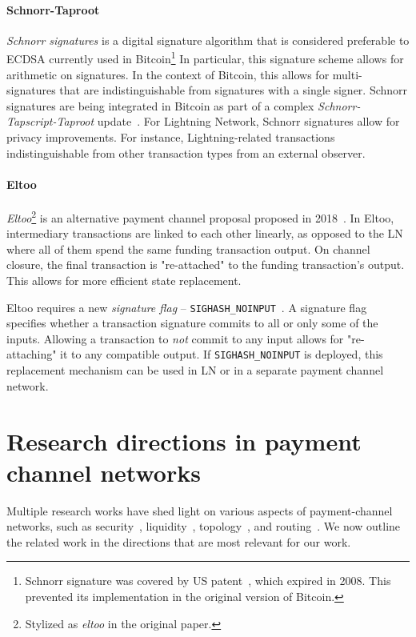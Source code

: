 \paragraph{Schnorr-Taproot}

\textit{Schnorr signatures} is a digital signature algorithm that is considered preferable to ECDSA currently used in Bitcoin\footnote{Schnorr signature was covered by US patent~\cite{Schnorr1989}, which expired in 2008. This prevented its implementation in the original version of Bitcoin.}
In particular, this signature scheme allows for arithmetic on signatures.
In the context of Bitcoin, this allows for multi-signatures that are indistinguishable from signatures with a single signer.
Schnorr signatures are being integrated in Bitcoin as part of a complex \textit{Schnorr-Tapscript-Taproot} update~\cite{Hertig2020}.
For Lightning Network, Schnorr signatures allow for privacy improvements.
For instance, Lightning-related transactions indistinguishable from other transaction types from an external observer.

\paragraph{Eltoo}

\textit{Eltoo}\footnote{Stylized as \textit{eltoo} in the original paper.} is an alternative payment channel proposal proposed in 2018~\cite{Decker2018}.
In Eltoo, intermediary transactions are linked to each other linearly, as opposed to the LN where all of them spend the same funding transaction output.
On channel closure, the final transaction is "re-attached" to the funding transaction's output.
This allows for more efficient state replacement.

Eltoo requires a new \textit{signature flag} -- \texttt{SIGHASH\_NOINPUT}~\cite{Decker2017}.
A signature flag specifies whether a transaction signature commits to all or only some of the inputs.
Allowing a transaction to \textit{not} commit to any input allows for "re-attaching" it to any compatible output.
If \texttt{SIGHASH\_NOINPUT} is deployed, this replacement mechanism can be used in LN or in a separate payment channel network.


\section{Research directions in payment channel networks}

Multiple research works have shed light on various aspects of payment-channel networks, such as security~\cite{Malavolta2019, Kiayias2019},  liquidity~\cite{Dandekar2011, MorenoSanchez2018, Conoscenti2019}, topology~\cite{Martinazzi2019, Seres2019}, and routing~\cite{Engelmann2017, Prihodko2016, Malavolta2017a, Grunspan2018, Osuntokun2018, Piatkivskyi2018, Roos2018, Sivaraman2018, Bagaria2019, Pickhardt2019, Pickhardt2019a, ZmnSCPxj2019, ZmnSCPxj2019a, ZmnSCPxj2019b}.
We now outline the related work in the directions that are most relevant for our work.

